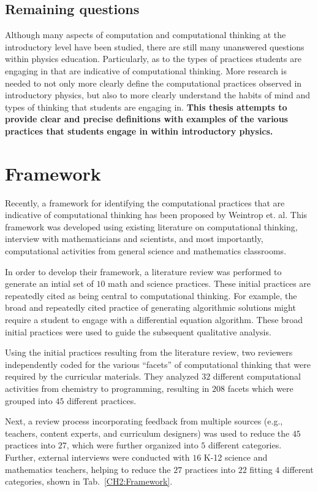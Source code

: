 \documentclass{msuphddissertation}
\begin{document}
\begin{doublespace}
\subsection{Remaining questions}

Although many aspects of computation and computational thinking at the introductory level have been studied, there are still many unanswered questions within physics education.  Particularly, as to the types of practices students are engaging in that are indicative of computational thinking.  More research is needed to not only more clearly define the computational practices observed in introductory physics, but also to more clearly understand the habits of mind and types of thinking that students are engaging in.  \textbf{This thesis attempts to provide clear and precise definitions with examples of the various practices that students engage in within introductory physics.}

\section{Framework}

Recently, a framework for identifying the computational practices that are indicative of computational thinking has been proposed by Weintrop et. al.  This framework was developed using existing literature on computational thinking, interview with mathematicians and scientists, and most importantly, computational activities from general science and mathematics classrooms.

In order to develop their framework, a literature review was performed to generate an intial set of $10$ math and science practices.  These initial practices are repeatedly cited as being central to computational thinking.  For example, the broad and repeatedly cited practice of generating algorithmic solutions might require a student to engage with a differential equation algorithm.  These broad initial practices were used to guide the subsequent qualitative analysis.

Using the initial practices resulting from the literature review, two reviewers independently coded for the various ``facets'' of computational thinking that were required by the curricular materials.  They analyzed $32$ different computational activities from chemistry to programming, resulting in $208$ facets which were grouped into $45$ different practices.

Next, a review process incorporating feedback from multiple sources (e.g., teachers, content experts, and curriculum designers) was used to reduce the $45$ practices into $27$, which were further organized into $5$ different categories.  Further, external interviews were conducted with $16$ K-12 science and mathematics teachers, helping to reduce the $27$ practices into $22$ fitting $4$ different categories, shown in Tab.~\ref{CH2:Framework}.


\end{doublespace}
\end{document}
